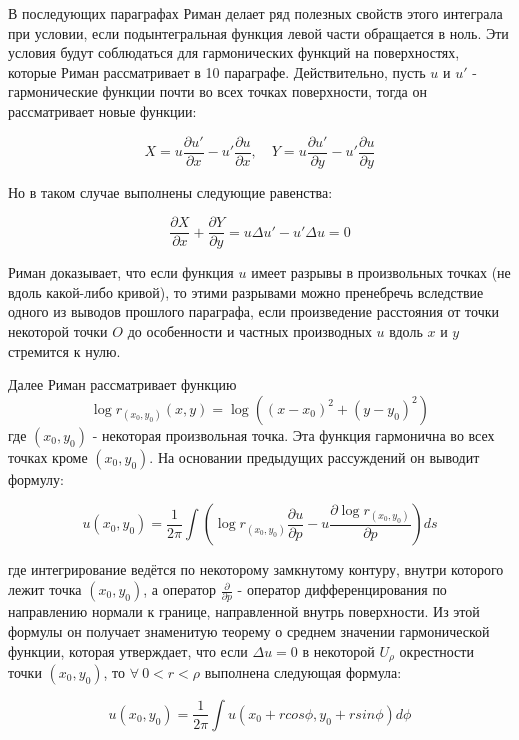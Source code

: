 \documentclass[a4paper,12pt]{article}
\theoremstyle{remark}
\begin{document}
В последующих параграфах Риман делает ряд полезных свойств этого интеграла
при условии, если подынтегральная функция левой части обращается в ноль.
Эти условия будут соблюдаться для гармонических функций
на поверхностях, которые Риман рассматривает в 10 параграфе.
Действительно, пусть $u$ и $u'$ - гармонические функции почти во всех точках поверхности, тогда он рассматривает новые функции:

\[X = u\dfrac{\partial u'}{\partial x} - u'\dfrac{\partial u}{\partial x}, \quad Y = u\dfrac{\partial u'}{\partial y} - u'\dfrac{\partial u}{\partial y}\]

Но в таком случае выполнены следующие равенства:

\[\dfrac{\partial X}{\partial x} + \dfrac{\partial Y}{\partial y} = u\Delta u' -u' \Delta u = 0\]

Риман доказывает, что если функция $u$ имеет разрывы
в произвольных точках (не вдоль какой-либо кривой),
то этими разрывами можно пренебречь вследствие одного из выводов прошлого параграфа,
если произведение расстояния от точки некоторой точки $O$
до особенности и частных производных $u$ вдоль $x$ и $y$ стремится к нулю.

Далее Риман рассматривает функцию
\[\log{r_{(x_0, y_0)}(x,y)} = \log{((x-x_0)^2+(y-y_0)^2)}\]
где $(x_0, y_0)$ - некоторая произвольная точка. Эта функция гармонична во всех точках кроме $(x_0, y_0)$. На основании предыдущих рассуждений он выводит формулу:

\[u(x_0, y_0) = \frac{1}{2\pi} \int \left( \log{r_{(x_0, y_0)}}\frac{\partial u}{\partial p} - u \frac{\partial \log{r_{(x_0, y_0)}}}{\partial p}  \right)ds\]

где интегрирование ведётся по некоторому замкнутому контуру, внутри которого лежит точка
$(x_0, y_0)$, а оператор $\frac{\partial}{\partial p}$ - оператор дифференцирования по направлению нормали к границе,
направленной внутрь поверхности. Из этой формулы он получает знаменитую теорему о среднем значении гармонической функции, которая утверждает, что если  $\Delta u = 0$ в некоторой $U_\rho$
окрестности точки $(x_0, y_0)$, то $\forall\ 0 < r < \rho$ выполнена следующая формула:

\[u(x_0, y_0) = \dfrac{1}{2\pi} \int u(x_0 + r cos \phi, y_0 + r sin \phi) d\phi \]
\end{document}
